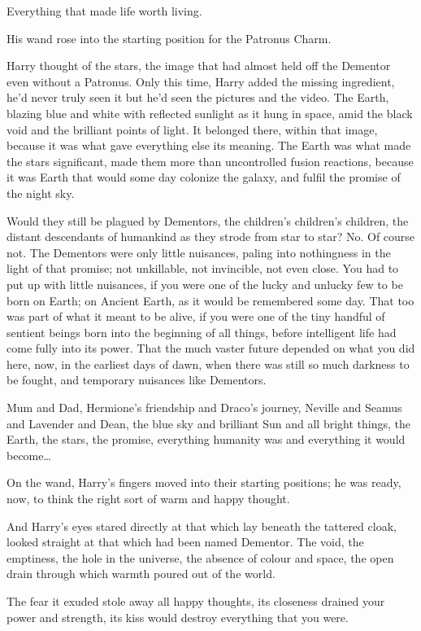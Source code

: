Everything that made life worth living.

His wand rose into the starting position for the Patronus Charm.

Harry thought of the stars, the image that had almost held off the Dementor even without a Patronus. Only this time, Harry added the missing ingredient, he'd never truly seen it but he'd seen the pictures and the video. The Earth, blazing blue and white with reflected sunlight as it hung in space, amid the black void and the brilliant points of light. It belonged there, within that image, because it was what gave everything else its meaning. The Earth was what made the stars significant, made them more than uncontrolled fusion reactions, because it was Earth that would some day colonize the galaxy, and fulfil the promise of the night sky.

Would they still be plagued by Dementors, the children's children's children, the distant descendants of humankind as they strode from star to star? No. Of course not. The Dementors were only little nuisances, paling into nothingness in the light of that promise; not unkillable, not invincible, not even close. You had to put up with little nuisances, if you were one of the lucky and unlucky few to be born on Earth; on Ancient Earth, as it would be remembered some day. That too was part of what it meant to be alive, if you were one of the tiny handful of sentient beings born into the beginning of all things, before intelligent life had come fully into its power. That the much vaster future depended on what you did here, now, in the earliest days of dawn, when there was still so much darkness to be fought, and temporary nuisances like Dementors.

Mum and Dad, Hermione's friendship and Draco's journey, Neville and Seamus and Lavender and Dean, the blue sky and brilliant Sun and all bright things, the Earth, the stars, the promise, everything humanity was and everything it would become{\ldots}

On the wand, Harry's fingers moved into their starting positions; he was ready, now, to think the right sort of warm and happy thought.

And Harry's eyes stared directly at that which lay beneath the tattered cloak, looked straight at that which had been named Dementor. The void, the emptiness, the hole in the universe, the absence of colour and space, the open drain through which warmth poured out of the world.

The fear it exuded stole away all happy thoughts, its closeness drained your power and strength, its kiss would destroy everything that you were.

